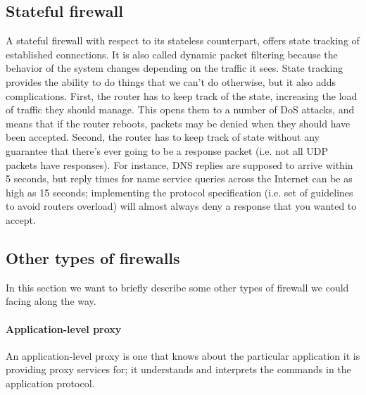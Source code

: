 \documentclass[11pt]{article}
\begin{document}
\subsection{Stateful firewall}
A stateful firewall with respect to its stateless counterpart, offers state tracking of established connections. It is also called dynamic packet filtering because the behavior of the system changes depending on the traffic it sees. State tracking provides the ability to do things that we can't do otherwise, but it also adds complications. First, the router has to keep track of the state, increasing the load of traffic they should manage. This opens them to a number of DoS attacks, and means that if the router reboots, packets may be denied when they should have been accepted. Second, the router has to keep track of state without any guarantee that there's ever going to be a response packet (i.e. not all UDP packets have responses). For instance, DNS replies are supposed to arrive within 5 seconds, but reply times for name service queries across the Internet can be as high as 15 seconds; implementing the protocol specification (i.e. set of guidelines to avoid routers overload) will almost always deny a response that you wanted to accept.
\subsection{Other types of firewalls}
In this section we want to briefly describe some other types of firewall we could facing along the way.
\paragraph{Application-level proxy} An application-level proxy is one that knows about the particular application it is providing proxy services for; it understands and interprets the commands in the application protocol. 
\end{document}
